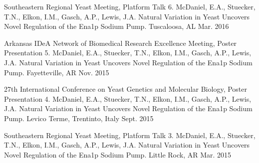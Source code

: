 

\begin{cvpubs}

  \cventry
    {Southeastern Regional Yeast Meeting, Platform Talk} %
    {6. McDaniel, E.A., Stuecker, T.N., Elkon, I.M., Gasch, A.P., Lewis, J.A. Natural Variation
in Yeast Uncovers Novel Regulation of the Ena1p Sodium Pump.} %
    {Tuscaloosa, AL} %
    {Mar. 2016} %
    {
      \begin{cvitems} %
      \end{cvitems}
    }
  \cventry
    {Arkansas IDeA Network of Biomedical Research Excellence Meeting, Poster Presentation} %
    {5. McDaniel, E.A., Stuecker, T.N., Elkon, I.M., Gasch, A.P., Lewis, J.A. Natural Variation
in Yeast Uncovers Novel Regulation of the Ena1p Sodium Pump.} %
    {Fayetteville, AR} %
    {Nov. 2015} %
    {
      \begin{cvitems} %
      \end{cvitems}
    }
  \cventry
    {27th International Conference on Yeast Genetics and Molecular Biology, Poster Presentation} %
    {4. McDaniel, E.A., Stuecker, T.N., Elkon, I.M., Gasch, A.P., Lewis, J.A. Natural Variation
in Yeast Uncovers Novel Regulation of the Ena1p Sodium Pump.} %
    {Levico Terme, Trentinto, Italy} %
    {Sept. 2015} %
    {
      \begin{cvitems} %
      \end{cvitems}
    }
  \cventry
    {Southeastern Regional Yeast Meeting, Platform Talk} %
    {3. McDaniel, E.A., Stuecker, T.N., Elkon, I.M., Gasch, A.P., Lewis, J.A. Natural Variation
in Yeast Uncovers Novel Regulation of the Ena1p Sodium Pump.} %
    {Little Rock, AR} %
    {Mar. 2015} %
    {
      \begin{cvitems} %
      \end{cvitems}
}
\end{cvpubs}
